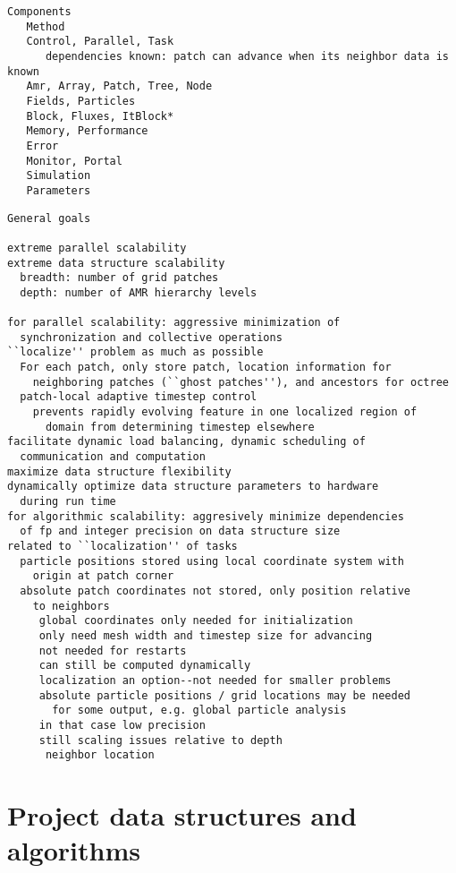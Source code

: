 \documentclass[14pt,letter]{article}
\begin{document}
\begin{verbatim}
Components
   Method
   Control, Parallel, Task
      dependencies known: patch can advance when its neighbor data is known
   Amr, Array, Patch, Tree, Node 
   Fields, Particles
   Block, Fluxes, ItBlock*
   Memory, Performance
   Error
   Monitor, Portal
   Simulation
   Parameters
\end{verbatim}

\begin{verbatim}
General goals

extreme parallel scalability
extreme data structure scalability
  breadth: number of grid patches
  depth: number of AMR hierarchy levels

for parallel scalability: aggressive minimization of
  synchronization and collective operations
``localize'' problem as much as possible
  For each patch, only store patch, location information for
    neighboring patches (``ghost patches''), and ancestors for octree
  patch-local adaptive timestep control
    prevents rapidly evolving feature in one localized region of
      domain from determining timestep elsewhere
facilitate dynamic load balancing, dynamic scheduling of
  communication and computation
maximize data structure flexibility
dynamically optimize data structure parameters to hardware
  during run time
for algorithmic scalability: aggresively minimize dependencies
  of fp and integer precision on data structure size
related to ``localization'' of tasks
  particle positions stored using local coordinate system with
    origin at patch corner
  absolute patch coordinates not stored, only position relative
    to neighbors
     global coordinates only needed for initialization
     only need mesh width and timestep size for advancing
     not needed for restarts
     can still be computed dynamically
     localization an option--not needed for smaller problems
     absolute particle positions / grid locations may be needed
       for some output, e.g. global particle analysis
     in that case low precision
     still scaling issues relative to depth
      neighbor location
\end{verbatim}

\section{Project data structures and algorithms}
\end{document}
